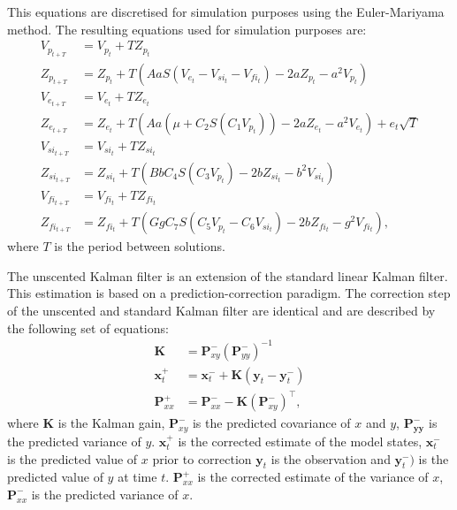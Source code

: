 This equations are discretised for simulation purposes using the Euler-Mariyama method. The resulting equations used for simulation purposes are: \begin{align}
\label{eqn: WendlingS}
V_{p_{t+T}}&= V_{p_{t}}+TZ_{p_{t}}\\
Z_{p_{t+T}}&= Z_{p_{t}} + T(AaS(V_{e_{t}}-V_{si_{t}}-V_{fi_{t}})-2aZ_{p_{t}}-a^{2}V_{p_{t}})\\
V_{e_{t+T}}&= V_{e_{t}}+TZ_{e_{t}}\\
Z_{e_{t+T}}&= Z_{e_{t}} + T(Aa(\mu +C_{2}S(C_{1}V_{p_{t}}))-2aZ_{e_{t}}-a^{2}V_{e_{t}})+e_{t}\sqrt{T}\\
V_{si_{t+T}}&= V_{si_{t}}+TZ_{si_{t}}\\
Z_{si_{t+T}}&= Z_{si_{t}} + T(BbC_{4}S(C_{3}V_{p_{t}})-2bZ_{si_{t}}-b^{2}V_{si_{t}})\\
V_{fi_{t+T}}&= V_{fi_{t}} + TZ_{fi_{t}}\\
Z_{fi_{t+T}}&= Z_{fi_{t}} + T(GgC_{7}S(C_{5}V_{p_{t}}-C_{6}V_{si_{t}})-2bZ_{fi_{t}}-g^{2}V_{fi_{t}}),
\end{align} where $T$ is the period between solutions.

The unscented Kalman filter is an extension of the standard linear Kalman filter. This estimation is based on a prediction-correction paradigm. The correction step of the unscented and standard Kalman filter are identical and are described by the following set of equations: \begin{align}
\label{eqn: KalmanC}
\mathbf{K} &= \mathbf{P}_{xy}^{-}(\mathbf{P}_{yy}^{-})^{-1}\\
\mathbf{x}_{t}^{+} &= \mathbf{x}_{t}^{-} + \mathbf{K}(\mathbf{y}_{t}-\mathbf{y}_{t}^{-})\\
\label{eqn: KalmanC3}
\mathbf{P}_{xx}^{+} &= \mathbf{P}_{xx}^{-} - \mathbf{K}(\mathbf{P}_{xy}^{-})^{\top},
\end{align} where $\mathbf{K}$ is the Kalman gain, $\mathbf{P}_{xy}^{-}$ is the predicted covariance of $x$ and $y$, $\mathbf{{P}_{yy}^{-}}$ is the predicted variance of $y$. $\mathbf{x}_{t}^{+}$ is the corrected estimate of the model states, $\mathbf{x}_{t}^{-}$ is the predicted value of $x$ prior to correction $\mathbf{y}_{t}$ is the observation and $\mathbf{y}_{t}^{-})$ is the predicted value of $y$ at time $t$. $\mathbf{P}_{xx}^{+}$ is the corrected estimate of the variance of $x$,  $\mathbf{P}_{xx}^{-}$ is the predicted variance of $x$. 


